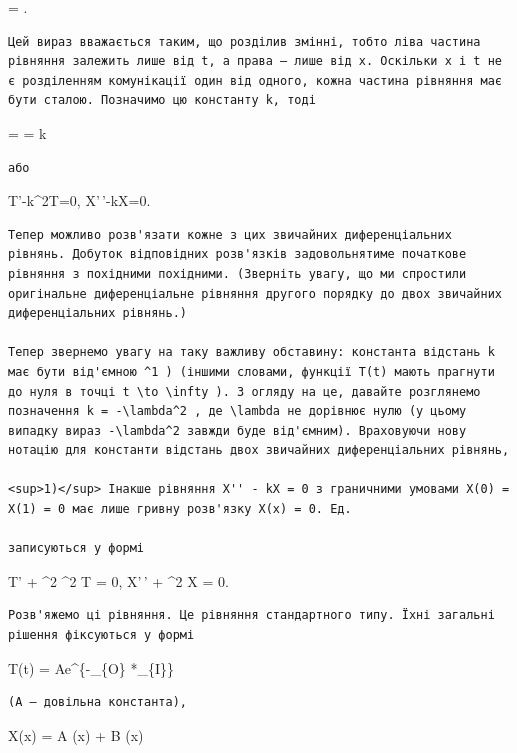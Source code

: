 \documentclass[
  ukrainian,
]{article}
\begin{document}
 = .

\begin{verbatim}
Цей вираз вважається таким, що розділив змінні, тобто ліва частина рівняння залежить лише від t, а права — лише від x. Оскільки x і t не є розділенням комунікації один від одного, кожна частина рівняння має бути сталою. Позначимо цю константу k, тоді
\end{verbatim}

 =  = k

\begin{verbatim}
або
\end{verbatim}

T'-k\alpha\^{}2T=0, X'\,'-kX=0.

\begin{verbatim}
Тепер можливо розв'язати кожне з цих звичайних диференціальних рівнянь. Добуток відповідних розв'язків задовольнятиме початкове рівняння з похідними похідними. (Зверніть увагу, що ми спростили оригінальне диференціальне рівняння другого порядку до двох звичайних диференціальних рівнянь.)

Тепер звернемо увагу на таку важливу обставину: константа відстань k має бути від'ємною ^1 ) (іншими словами, функції T(t) мають прагнути до нуля в точці t \to \infty ). З огляду на це, давайте розглянемо позначення k = -\lambda^2 , де \lambda не дорівнює нулю (у цьому випадку вираз -\lambda^2 завжди буде від'ємним). Враховуючи нову нотацію для константи відстань двох звичайних диференціальних рівнянь,

<sup>1)</sup> Інакше рівняння X'' - kX = 0 з граничними умовами X(0) = X(1) = 0 має лише гривну розв'язку X(x) = 0. Ед.

записуються у формі
\end{verbatim}

T' + \lambda\^{}2 \alpha\^{}2 T = 0, X'\,' + \lambda\^{}2 X = 0.

\begin{verbatim}
Розв'яжемо ці рівняння. Це рівняння стандартного типу. Їхні загальні рішення фіксуються у формі
\end{verbatim}

T(t) = Ae\^{}\{-\gamma *\_\{O\} *\_\{I\}\}

\begin{verbatim}
(A — довільна константа),
\end{verbatim}

X(x) = A \sin(\lambda x) + B \cos(\lambda x)
\end{document}
